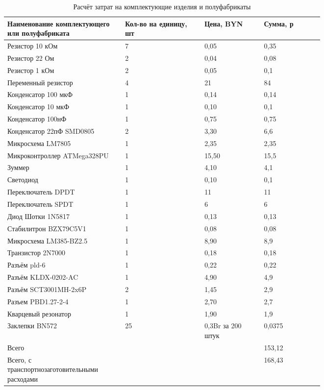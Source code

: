 \begin{longtable}{| p{0.25\linewidth} |  p{0.2\linewidth} |  p{0.15\linewidth} |  p{0.15\linewidth} |}
  \caption{Расчёт затрат на комплектующие изделия и полуфабрикаты} \\
\hline
Наименование комплектующего или полуфабриката & Кол-во на единицу, шт & Цена, BYN & Сумма, р\\%
\hline
  Резистор 10 кОм & 7 & 0,05 & 0,35 \\
  \hline
  Резистор 22 Ом  & 2 & 0,04 & 0,08 \\[0pt]
  \hline
  Резистор 1 кОм  & 2 & 0,05 & 0,1\\[0pt]
  \hline
  Переменный резистор & 4 & 21 & 84\\[0pt]
  \hline
  Конденсатор 100 мкФ & 1 & 0,14 & 0,14\\[0pt]
  \hline
  Конденсатор 10 мкФ  & 1 & 0,10 & 0,1\\[0pt]
  \hline
  Конденсатор 100нФ & 1 & 0,75 & 0,75 \\[0pt]
  \hline
  Конденсатор 22пФ SMD0805 & 2 & 3,30 & 6,6\\[0pt]
  \hline
  Микросхема LM7805 & 1 & 2,35 & 2,35 \\[0pt]
  \hline
  Микроконтроллер ATMega328PU & 1 & 15,50 & 15,5 \\[0pt]
  \hline
  Зуммер & 1 & 4,10 & 4,1 \\[0pt]
  \hline
  Светодиод & 1 & 0,10 & 0,1 \\[0pt]
  \hline
  Переключатель DPDT & 1 & 11 & 11 \\[0pt]
  \hline
  Переключатель SPDT & 1 & 6 & 6\\[0pt]
  \hline
  Диод Шотки 1N5817 & 1 & 0,13 & 0,13 \\[0pt]
  \hline
  Стабилитрон BZX79C5V1 & 1 & 0,08 & 0,08 \\[0pt]
  \hline
  Микросхема LM385-BZ2.5 & 1 & 8,90 & 8,9\\[0pt]
  \hline
  Транзистор 2N7000 & 1 & 0,18 & 0,18 \\[0pt]
  \hline
  Разъём pld-6 & 1 & 0,22 & 0,22 \\[0pt]
  \hline
  Разъём KLDX-0202-AC & 1 & 4,90 & 4,9 \\[0pt]
  \hline
  Разъём SCT3001MH-2x6P & 2 & 1,45 & 2,9 \\[0pt]
  \hline
  Разъем PBD1.27-2-4 & 1 & 2,70 & 2,7 \\[0pt]
  \hline
  Кварцевый резонатор & 1 & 1,90 & 1,9\\[0pt]
  \hline
  Заклепки BN572 & 25 & 0,3Br за 200 штук & 0,0375\\[0pt]
  \hline
  Всего &  &  & 153,12\\[0pt]
  \hline
  Всего, с транспортнозаготовительными расходами &  &  & 168,43\\[0pt]
  \hline
\end{longtable}
    
